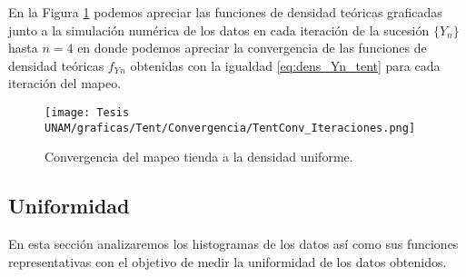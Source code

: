 \documentclass[../Main.tex]{subfiles}
\begin{document}

En la Figura \ref{fig:tent_conv} podemos apreciar las funciones de densidad teóricas graficadas junto a la simulación numérica de los datos en cada iteración de la sucesión $\{Y_n\}$ hasta $n=4$ en donde podemos apreciar la convergencia de las funciones de densidad teóricas $f_Y{_n}$ obtenidas con la igualdad \ref{eq:dens_Yn_tent} para cada iteración del mapeo.


\begin{figure}[h]
    \centering
    \texttt{[image: Tesis UNAM/graficas/Tent/Convergencia/TentConv\_Iteraciones.png]}
    \caption{Convergencia del mapeo tienda a la densidad uniforme.}
    \label{fig:tent_conv}
\end{figure} 


\subsection{Uniformidad}
En esta sección analizaremos los histogramas de los datos así como sus funciones representativas con el objetivo de medir la uniformidad de los datos obtenidos.
\end{document}
